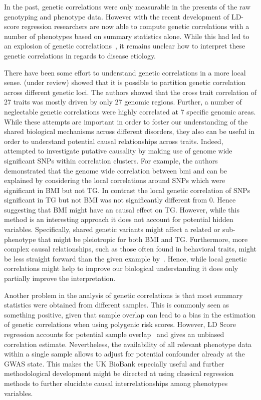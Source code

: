 In the past, genetic correlations were only measurable in the presents of the raw genotyping and phenotype data.
However with the recent development of LD-score regression researchers are now able to compute genetic correlations with a number of phenotypes based on summary statistics alone.
While this had led to an explosion of genetic correlations~\cite{Bulik-Sullivan2015b,Bulik-Sullivan2015a}, it remains unclear how to interpret these genetic correlations in regards to disease etiology.

There have been some effort to understand genetic correlations in a more local sense.
\citet{Shi2016a} (under review) showed that it is possible to partition genetic correlation across different genetic loci.
The authors showed that the cross trait correlation of 27 traits was mostly driven by only 27 genomic regions. 
Further, a number of neglectable genetic correlations were highly correlated at 7 specific genomic areas.
While these attempts are important in order to foster our understanding of the shared biological mechanisms across different disorders, they also can be useful in order to understand potential causal relationships across traits.
Indeed,~\citet{Shi2016a} attempted to investigate putative causality by making use of genome wide significant SNPs within correlation clusters.
For example, the authors demonstrated that the genome wide correlation between \acrfull{bmi} and  can be explained by considering the local correlations around SNPs which were significant in BMI but not TG\@.
In contrast the local genetic correlation of SNPs significant in TG  but not BMI was not significantly different from $0$.
Hence suggesting that BMI might have an causal effect on TG\@.
However, while this method is an interesting approach it does not account for potential hidden variables.
Specifically, shared genetic variants might affect a related or sub-phenotype that might be pleiotropic for both BMI and TG\@.
Furthermore, more complex causal relationships, such as those often found in behavioral traits, might be less straight forward than the given example by~\citet{Shi2016a}.
Hence, while local genetic correlations might help to improve our biological understanding it does only partially improve the interpretation.

Another problem in the analysis of genetic correlations is that most summary statistics were obtained from different samples.
This is commonly seen as something positive, given that sample overlap can lead to a bias in the estimation of genetic correlations when using polygenic risk scores. 
However, LD Score regression accounts for potential sample overlap~\cite{Bulik-Sullivan2015a} and gives an unbiased correlation estimate.  
Nevertheless, the availability of all relevant phenotype data within a single sample allows to adjust for potential confounder already at the GWAS state.
This makes the UK BioBank especially useful and further methodological development might be directed at using classical regression methods to further elucidate causal interrelationships among phenotypes variables.

